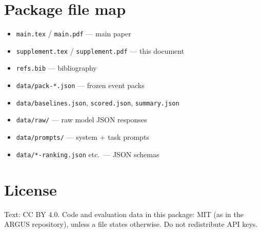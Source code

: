 \documentclass[11pt,a4paper]{article}
\begin{document}
\section{Package file map}
\begin{itemize}
  \item \texttt{main.tex} / \texttt{main.pdf} --- main paper
  \item \texttt{supplement.tex} / \texttt{supplement.pdf} --- this document
  \item \texttt{refs.bib} --- bibliography
  \item \texttt{data/pack-*.json} --- frozen event packs
  \item \texttt{data/baselines.json}, \texttt{scored.json}, \texttt{summary.json}
  \item \texttt{data/raw/} --- raw model JSON responses
  \item \texttt{data/prompts/} --- system + task prompts
  \item \texttt{data/*-ranking.json} etc.\ --- JSON schemas
\end{itemize}

\section{License}
Text: CC BY 4.0.
Code and evaluation data in this package: MIT (as in the ARGUS repository), unless a file states otherwise.
Do not redistribute API keys.
\end{document}

